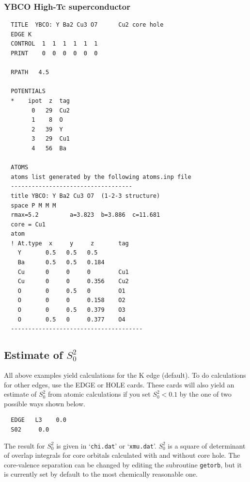 \documentclass[11pt,oneside]{report} %
\renewcommand{\htmlref}[2]{\hyperlink{#2}{#1}}
\newcommand{\file}[1]{`\texttt{#1}'}
\renewcommand{\htmlref}[2]{{#1}} %
\begin{document}
\subsubsection{YBCO High-Tc superconductor}
\label{sec:YBCO-High-Tc}


\begin{verbatim}
  TITLE  YBCO: Y Ba2 Cu3 O7      Cu2 core hole
  EDGE K
  CONTROL  1  1  1  1  1  1
  PRINT    0  0  0  0  0  0
  
  RPATH   4.5
  
  POTENTIALS
  *    ipot  z  tag
        0   29  Cu2
        1    8  O
        2   39  Y
        3   29  Cu1
        4   56  Ba
  
  ATOMS
  atoms list generated by the following atoms.inp file
  -----------------------------------
  title YBCO: Y Ba2 Cu3 O7  (1-2-3 structure)
  space P M M M
  rmax=5.2         a=3.823  b=3.886  c=11.681
  core = Cu1
  atom
  ! At.type  x     y     z       tag
    Y       0.5   0.5   0.5
    Ba      0.5   0.5   0.184
    Cu      0     0     0        Cu1
    Cu      0     0     0.356    Cu2
    O       0     0.5   0        O1
    O       0     0     0.158    O2
    O       0     0.5   0.379    O3
    O       0.5   0     0.377    O4
  --------------------------------------
\end{verbatim}





\subsection{Estimate of $S_0^2$}
\label{sec:S02-estimate}
All above examples yield calculations for the K edge (default). To do
calculations for other edges, use the \htmlref{EDGE}{card:edg} or 
\htmlref{HOLE}{card:hol} cards. These cards
will also yield an estimate of $S_0^2$ from atomic calculations if you
set $S_0^2<0.1$ by the one of two possible ways shown below.
\begin{verbatim}
  EDGE   L3    0.0
  S02     0.0
\end{verbatim}

The result for $S_0^2$ is given in \file{chi.dat} or \file{xmu.dat}.
$S_0^2$ is a square of determinant of overlap integrals for core
orbitals calculated with and without core hole. The core-valence
separation can be changed by editing the subroutine \texttt{getorb}, but
it is currently set by default to the most chemically reasonable one.
\end{document}
